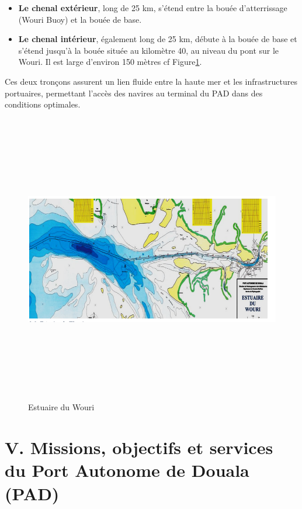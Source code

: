 \documentclass[a4paper,12pt,openany]{report}
\begin{document}
	\begin{itemize}
		\item \textbf{Le chenal extérieur}, long de 25 km, s’étend entre la bouée d’atterrissage (Wouri Buoy) et la bouée de base.
		
		\item \textbf{Le chenal intérieur}, également long de 25 km, débute à la bouée de base et s’étend jusqu’à la bouée située au kilomètre 40, au niveau du pont sur le Wouri. Il est large d’environ 150 mètres cf Figure\ref{Fig 1}.
	\end{itemize}
	
	Ces deux tronçons assurent un lien fluide entre la haute mer et les infrastructures portuaires, permettant l’accès des navires au terminal du PAD dans des conditions optimales.
	
	
	\begin{figure}[H]
		\centering
		\includegraphics[width=1\textwidth,height=5in]{images/estuaireduWouri.png}
		\caption{Estuaire du Wouri\label{Fig 1}}
	\end{figure}
	
	
	
	
	\section*{V. Missions, objectifs et services du Port Autonome de Douala (PAD)}
	
\end{document}
